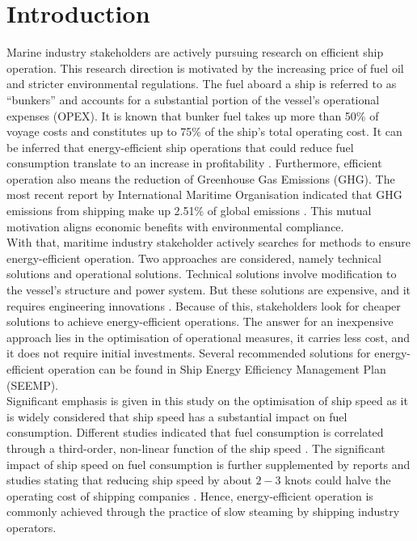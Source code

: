 \chapter{Introduction} \label{chp:introduction}

Marine industry stakeholders are actively pursuing research on efficient ship operation. This research direction is motivated by the increasing price of fuel oil and stricter environmental regulations. The fuel aboard a ship is referred to as ``bunkers'' and accounts for a substantial portion of the vessel's operational expenses (OPEX). It is known that bunker fuel takes up more than 50\% of voyage costs and constitutes up to 75\% of the ship's total operating cost. It can be inferred that energy-efficient ship operations that could reduce fuel consumption translate to an increase in profitability . Furthermore, efficient operation also means the reduction of Greenhouse Gas Emissions (GHG). The most recent report by International Maritime Organisation indicated that GHG emissions from shipping make up 2.51\% of global emissions . This mutual motivation aligns economic benefits with environmental compliance.\\

With that, maritime industry stakeholder actively searches for methods to ensure energy-efficient operation. Two approaches are considered, namely technical solutions and operational solutions. Technical solutions involve modification to the vessel's structure and power system. But these solutions are expensive, and it requires engineering innovations . Because of this, stakeholders look for cheaper solutions to achieve energy-efficient operations. The answer for an inexpensive approach lies in the optimisation of operational measures, it carries less cost, and it does not require initial investments. Several recommended solutions for energy-efficient operation can be found in Ship Energy Efficiency Management Plan (SEEMP).\\ 

Significant emphasis is given in this study on the optimisation of ship speed as it is widely considered that ship speed has a substantial impact on fuel consumption. Different studies indicated that fuel consumption is correlated through a third-order, non-linear function of the ship speed . The significant impact of ship speed on fuel consumption is further supplemented by reports and studies stating that reducing ship speed by about $2-3$ knots could halve the operating cost of shipping companies . Hence, energy-efficient operation is commonly achieved through the practice of slow steaming by shipping industry operators. \\

